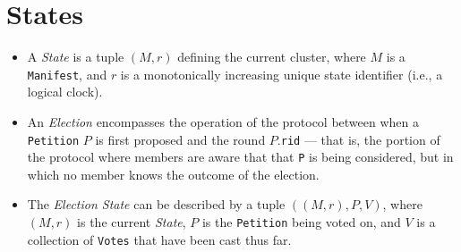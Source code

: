 \section{States}
\begin{itemize}
  \item A \emph{State} is a tuple $(M, r)$ defining the current cluster, where
    $M$ is a \texttt{Manifest}, and $r$ is a monotonically increasing unique
    state identifier (i.e., a logical clock)\tocite.

  \item An \emph{Election} encompasses the operation of the protocol between
    when a \texttt{Petition} $P$ is first proposed and the round
    $P$.\texttt{rid} --- that is, the portion of the protocol where members are
    aware that that \texttt{P} is being considered, but in which no member knows
    the outcome of the election.

  \item The \emph{Election State} can be described by a tuple
    $((M, r), P, V)$, where $(M, r)$ is the current \emph{State}, $P$ is the
    \texttt{Petition} being voted on, and $V$ is a collection of \texttt{Votes}
    that have been cast thus far.


\end{itemize}

